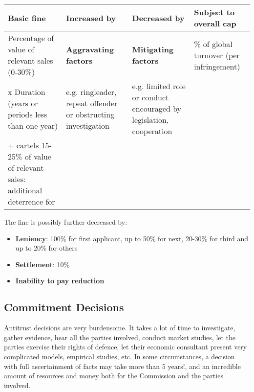    \begin{tabular}{|>{\raggedright\arraybackslash}m{4cm}|>{\raggedright\arraybackslash}m{4cm}|>{\raggedright\arraybackslash}m{4cm}|>{\raggedright\arraybackslash}m{4cm}|}
    \hline
    \textbf{Basic fine} & \textbf{Increased by} & \textbf{Decreased by} & \textbf{Subject to overall cap} \\ 
    \hline
    Percentage of value of relevant sales (0-30\%) & \textbf{Aggravating factors} & \textbf{Mitigating factors} & 10\% of global turnover (per infringement) \\ 
    \hline
    x Duration (years or periods less than one year) & e.g. ringleader, repeat offender or obstructing investigation & e.g. limited role or conduct encouraged by legislation, cooperation &  \\ 
    \hline
    + cartels 15-25\% of value of relevant sales: additional deterrence for & & &  \\ 
    \hline
    \end{tabular}

    \vspace{0.3cm}

    The fine is possibly further decreased by:
    \begin{itemize}
        \item \textbf{Leniency}: 100\% for first applicant, up to 50\% for next, 20-30\% for third and up to 20\% for others
        \item \textbf{Settlement}: 10\%
        \item \textbf{Inability to pay reduction}
    \end{itemize}

\newpage
    \subsection{Commitment Decisions}

    Antitrust decisions are very burdensome. It takes a lot of time to investigate, gather evidence, hear all the parties involved, conduct market studies, let the parties exercise their rights of defence, let their economic consultant present very complicated models, empirical studies, etc. In some circumstances, a decision with full ascertainment of facts may take more than 5 years!, and an incredible amount of resources and money both for the Commission and the parties involved.

